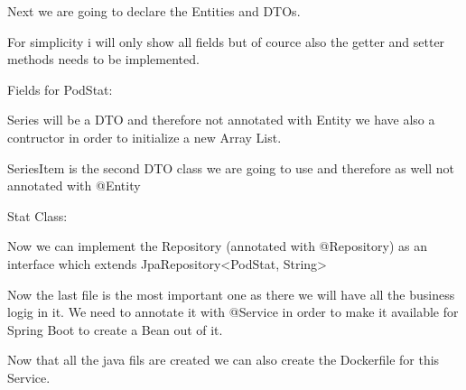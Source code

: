 Next we are going to declare the Entities and DTOs.

For simplicity i will only show all fields but of cource also the getter and setter methods needs to be implemented.

Fields for PodStat:


Series will be a DTO and therefore not annotated with Entity we have also a contructor in order to initialize a new Array List.


SeriesItem is the second DTO class we are going to use and therefore as well not annotated with @Entity

\newpage
Stat Class:


Now we can implement the Repository (annotated with @Repository) as an interface which extends JpaRepository<PodStat, String>


Now the last file is the most important one as there we will have all the business logig in it.
\newpage
We need to annotate it with @Service in order to make it available for Spring Boot to create a Bean out of it.



Now that all the java fils are created we can also create the Dockerfile for this Service.

